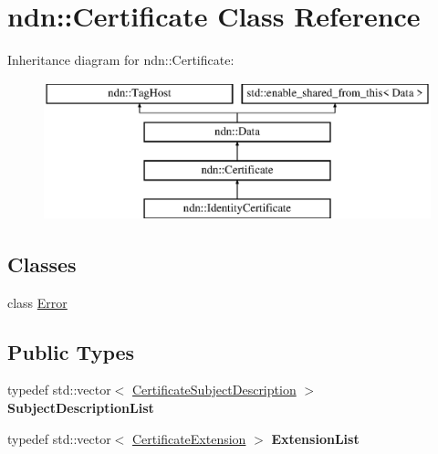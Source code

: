 \hypertarget{classndn_1_1Certificate}{}\section{ndn\+:\+:Certificate Class Reference}
\label{classndn_1_1Certificate}
Inheritance diagram for ndn\+:\+:Certificate\+:\begin{figure}[H]
\begin{center}
\leavevmode
\includegraphics[height=4.000000cm]{classndn_1_1Certificate}
\end{center}
\end{figure}
\subsection*{Classes}
\begin{DoxyCompactItemize}
\item 
class \hyperlink{classndn_1_1Certificate_1_1Error}{Error}
\end{DoxyCompactItemize}
\subsection*{Public Types}
\begin{DoxyCompactItemize}
\item 
typedef std\+::vector$<$ \hyperlink{classndn_1_1CertificateSubjectDescription}{Certificate\+Subject\+Description} $>$ {\bfseries Subject\+Description\+List}\hypertarget{classndn_1_1Certificate_abf38beef3035512447928054d93c4ec9}{}\label{classndn_1_1Certificate_abf38beef3035512447928054d93c4ec9}

\item 
typedef std\+::vector$<$ \hyperlink{classndn_1_1CertificateExtension}{Certificate\+Extension} $>$ {\bfseries Extension\+List}\hypertarget{classndn_1_1Certificate_af455507be2e9d337aba877169635ae94}{}\label{classndn_1_1Certificate_af455507be2e9d337aba877169635ae94}

\end{DoxyCompactItemize}
